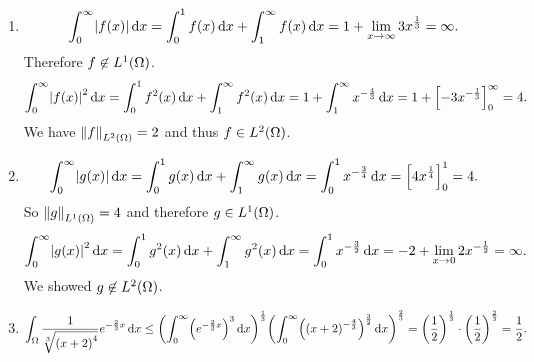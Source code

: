 \documentclass[english]{exercise}
\begin{document}
	\begin{enumerate}
		\item
		\[
			\int_0^\infty \absolute*{f\parentheses*{x}}\d x = \int_0^1 f\parentheses*{x}\d x + \int_1^\infty f\parentheses*{x}\d x = 1 + \lim_{x \to \infty}3x^{\frac{1}{3}} = \infty.
		\]
		Therefore \(f \not\in L^1\parentheses*{\Omega}\).
		\[
			\int_0^\infty \absolute*{f\parentheses*{x}}^2 \d x = \int_0^1 f^2\parentheses*{x}\d x + \int_1^\infty f^2\parentheses*{x}\d x = 1 + \int_1^\infty x^{-\frac{4}{3}}\d x = 1 + \brackets*{-3x^{-\frac{1}{3}}}_0^\infty = 4.
		\]
		We have \(\norm*{f}_{L^2\parentheses*{\Omega}} = 2\) and thus \(f \in L^2\parentheses*{\Omega}\).
		\item
		\[
			\int_0^\infty \absolute*{g\parentheses*{x}}\d x = \int_0^1 g\parentheses*{x}\d x + \int_1^\infty g\parentheses*{x}\d x = \int_0^1 x^{-\frac{3}{4}}\d x = \brackets*{4x^{\frac{1}{4}}}_0^1 = 4.
		\]
		So \(\norm*{g}_{L^1\parentheses*{\Omega}} = 4\) and therefore \(g \in L^1\parentheses*{\Omega}\).
		\[
			\int_0^\infty \absolute*{g\parentheses*{x}}^2 \d x = \int_0^1 g^2\parentheses*{x}\d x + \int_1^\infty g^2\parentheses*{x}\d x = \int_0^1 x^{-\frac{3}{2}}\d x = -2 + \lim_{x \to 0}2x^{-\frac{1}{2}} = \infty.
		\]
		We showed \(g \not\in L^2\parentheses*{\Omega}\).
		\item
		\[
			\int_\Omega \frac{1}{\sqrt[3]{\parentheses*{x + 2}^4}}e^{-\frac{2}{3}x}\d x \le \parentheses*{\int_0^\infty \parentheses*{e^{-\frac{2}{3}x}}^3 \d x}^{\frac{1}{3}}\parentheses*{\int_0^\infty \parentheses*{\parentheses*{x + 2}^{-\frac{4}{3}}}^{\frac{3}{2}}\d x}^{\frac{2}{3}} = \parentheses*{\frac{1}{2}}^{\frac{1}{3}} \cdot \parentheses*{\frac{1}{2}}^{\frac{2}{3}} = \frac{1}{2}.
		\]
	\end{enumerate}
\end{document}
